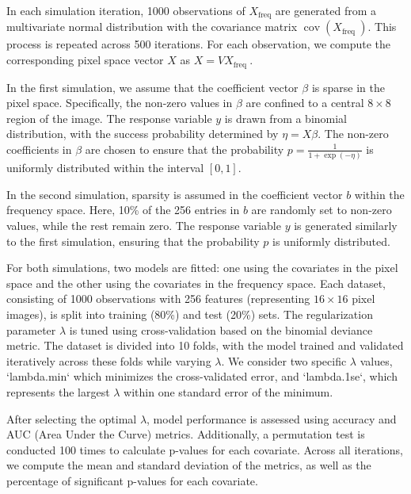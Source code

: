 \documentclass[12pt]{article}
\begin{document}
In each simulation iteration, 1000 observations of \( X_{\text {freq}} \) are generated from a multivariate normal
distribution with the covariance matrix \(\operatorname{cov}\left(X_{\text {freq }}\right) \). This process is repeated
across 500 iterations.  For each observation, we compute the corresponding pixel space vector \( X \) as \( X=V X_{\text
{freq }} \).

In the first simulation, we assume that the coefficient vector \( \beta \) is sparse in the pixel space. Specifically,
the non-zero values in \( \beta \) are confined to a central \( 8 \times 8 \) region of the image. The response variable
\( y \) is drawn from a binomial distribution, with the success probability determined by \( \eta = X \beta \). The
non-zero coefficients in \( \beta \) are chosen to ensure that the probability \( p = \frac{1}{1 + \exp(-\eta)} \) is
uniformly distributed within the interval \( [0, 1] \).

In the second simulation, sparsity is assumed in the coefficient vector \( b \) within the frequency space. Here, 10\%
of the 256 entries in \( b \) are randomly set to non-zero values, while the rest remain zero. The response variable \(
y \) is generated similarly to the first simulation, ensuring that the probability \( p \) is uniformly distributed. 

For both simulations, two models are fitted: one using the covariates in the pixel space and the other using the
covariates in the frequency space. Each dataset, consisting of 1000 observations with 256 features (representing \( 16
\times 16 \) pixel images), is split into training (80\%) and test (20\%) sets. The regularization parameter \( \lambda
\) is tuned using cross-validation based on the binomial deviance metric. The dataset is divided into 10 folds, with the
model trained and validated iteratively across these folds while varying \( \lambda \). We consider two specific \(
\lambda \) values, `lambda.min` which minimizes the cross-validated error, and `lambda.1se`, which represents the
largest \( \lambda \) within one standard error of the minimum.

After selecting the optimal \( \lambda \), model performance is assessed using accuracy and AUC (Area Under the Curve)
metrics. Additionally, a permutation test is conducted 100 times to calculate p-values for each covariate. Across all
iterations, we compute the mean and standard deviation of the metrics, as well as the percentage of significant p-values
for each covariate.  
\end{document}
